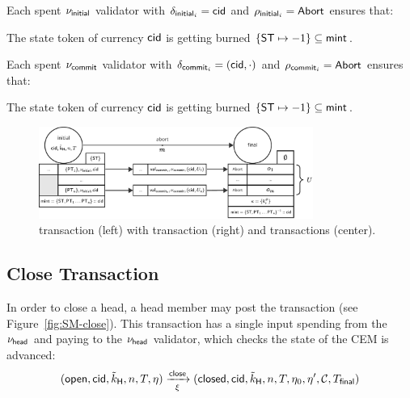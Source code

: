 \noindent Each spent $\nu_{\mathsf{initial}}$ validator with $\delta_{\mathsf{initial}_{i}} = \mathsf{cid}$ and $\rho_{\mathsf{initial}_{i}} = \mathsf{Abort}$ ensures that:
\begin{menumerate}
  \item The state token of currency $\mathsf{cid}$ is getting burned $\{\mathsf{ST} \mapsto -1\} \subseteq \mathsf{mint}$.
\end{menumerate}

\noindent Each spent $\nu_{\mathsf{commit}}$ validator with $\delta_{\mathsf{commit}_{i}} = (\mathsf{cid},\cdot)$ and $\rho_{\mathsf{commit}_{i}} = \mathsf{Abort}$ ensures that:
\begin{menumerate}
  \item The state token of currency $\mathsf{cid}$ is getting burned $\{\mathsf{ST} \mapsto -1\} \subseteq \mathsf{mint}$.
\end{menumerate}

\begin{figure}[h]
  \centering
  \includegraphics[width=0.8\textwidth]{figures/SM-abort.pdf}
  \caption{\mtxInit{} transaction (left) with \mtxAbort{} transaction (right)
    and \mtxCom{} transactions (center).}\label{fig:SM-abort}
\end{figure}

\subsection{Close Transaction}\label{sec:close-tx}

In order to close a head, a head member may post the \mtxClose{} transaction
(see Figure~\ref{fig:SM-close}). This transaction has a single input
spending from the $\nu_\mathsf{head}$ and paying to the $\nu_\mathsf{head}$ validator, which checks
the state of the CEM is advanced:
\[
  (\mathsf{open},\mathsf{cid},\tilde{k}_{\mathsf{H}},n,T,\eta) \xrightarrow[\xi]{\mathsf{close}} (\mathsf{closed},\mathsf{cid},\tilde{k}_{\mathsf{H}},n,T,\eta_0,\eta',\mathcal{C},T_{\mathsf{final}})
\]

